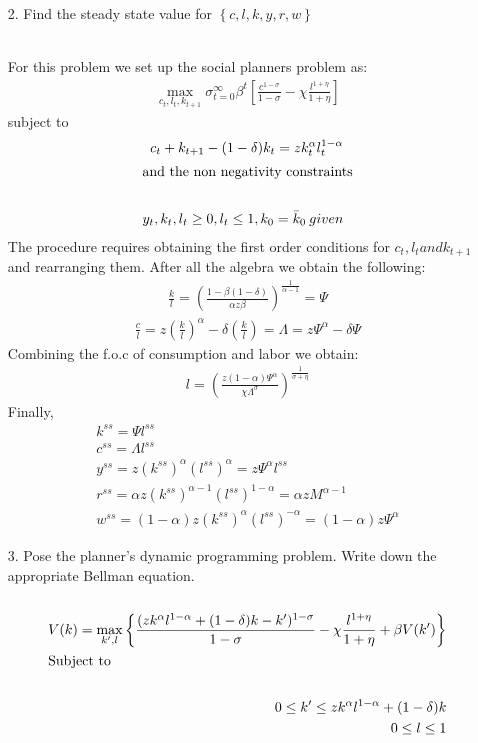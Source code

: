 \documentclass[a4paper]{article}
\begin{document}
\begin{enumerate}
\item[2.] Find the steady state value for $\left\lbrace c,l,k,y,r,w \right\rbrace$\\~\

For this problem we set up the social planners problem as:
\begin{align*}
\max_{c_t, l_t, k_{t+1}} \sigma_{t=0}^{\infty} \beta^{t} \left[  \frac{c^{1-\sigma}}{1-\sigma} - \chi \frac{l^{1+\eta}}{1+\eta} \right]
\end{align*}
subject to 
\begin{align*}
c_t+ k_{t+1} - (1-\delta)k_t = zk_{t}^{\alpha}l_{t}^{1- \alpha} \\
\intertext{and the non negativity constraints}\\
y_{t},k_{t},l_{t} \geq 0, l_t \leq 1, k_0 = \bar{k}_0 \: given
\end{align*}
The procedure requires obtaining the first order conditions for $c_t, l_t and k_{t+1}$ and rearranging them. After all the algebra we obtain the following:
\begin{align*}
\frac{k}{l} = \left( \frac{1-\beta (1-\delta)}{\alpha z \beta} \right)^{\frac{1}{\alpha - 1}} = \Psi
\end{align*}
\begin{align*}
\frac{c}{l} = z\left(\frac{k}{l}\right)^{\alpha} - \delta \left(\frac{k}{l}\right) = \Lambda = z \Psi^{\alpha} - \delta \Psi
\end{align*}
Combining the f.o.c of consumption and labor we obtain:
\begin{align*}
l = \left( \frac{z(1-\alpha) \Psi^{\alpha}}{\chi \Lambda^{\sigma}} \right)^{\frac{1}{\sigma + \eta}}
\end{align*}
Finally,
\begin{align*}
k^{ss} = \Psi l^{ss}\\
c^{ss}  = \Lambda l^{ss}\\
y^{ss} = z(k^{ss})^{\alpha}(l^{ss})^{\alpha} = z\Psi^{\alpha}l^{ss}\\
r^{ss} = \alpha z (k^{ss})^{\alpha-1} (l^{ss})^{1-\alpha} = \alpha z M^{\alpha - 1}\\
w^{ss} = (1-\alpha)z(k^{ss})^{\alpha}(l^{ss})^{-\alpha} = (1-\alpha)z\Psi^{\alpha}
\end{align*}


\item[3.] Pose the planner’s dynamic programming problem. Write down the appropriate Bellman equation.\\~\
\begin{align*}
V(k) = \max_{k', l} \left\lbrace \frac{(zk^{\alpha}l^{1-\alpha} + (1-\delta)k  - k'  )^{1-\sigma}}{1-\sigma}  -\chi \frac{l^{1+\eta}}{1+\eta} + \beta V(k') \right\rbrace\\
\intertext{Subject to}\\
0\leq k' \leq zk^{\alpha}l^{1-\alpha} + (1-\delta)k\\
0\leq l \leq 1
\end{align*}


\end{enumerate}
\end{document}
